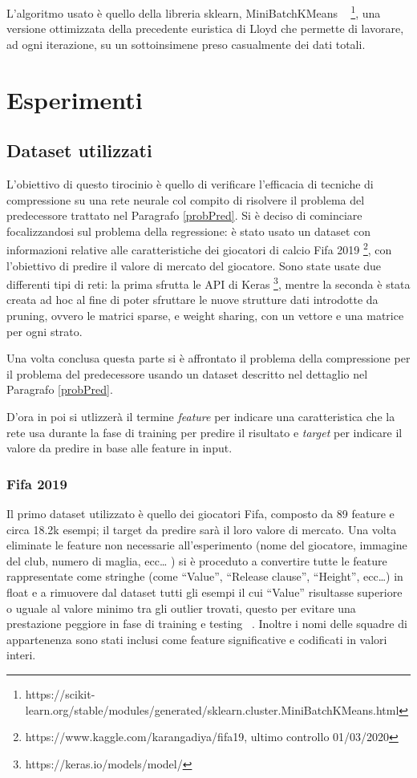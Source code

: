 \documentclass[12pt]{report}
\begin{document}
L’algoritmo usato è quello della libreria sklearn, MiniBatchKMeans ~\cite{KMeansMiniBatch} \footnote{https://scikit-learn.org/stable/modules/generated/sklearn.cluster.MiniBatchKMeans.html}, una versione ottimizzata della precedente euristica di Lloyd che permette di lavorare, ad ogni iterazione, su un sottoinsimene preso casualmente dei dati totali.


\chapter{Esperimenti}

\section{Dataset utilizzati}
L'obiettivo di questo tirocinio è quello di verificare l'efficacia di tecniche di compressione su una rete neurale col compito di risolvere il problema del predecessore trattato nel Paragrafo \ref{probPred}.
Si è deciso di cominciare focalizzandosi sul problema della regressione: è stato usato un dataset con informazioni relative alle caratteristiche dei giocatori di calcio Fifa 2019 \footnote{https://www.kaggle.com/karangadiya/fifa19, ultimo controllo 01/03/2020}, con l’obiettivo di predire il valore di mercato del giocatore. Sono state usate due differenti tipi di reti: la prima sfrutta le API di Keras \footnote{https://keras.io/models/model/}, mentre la seconda è stata creata ad hoc al fine di poter sfruttare le nuove strutture dati introdotte da pruning, ovvero le matrici sparse, e weight sharing, con un vettore e una matrice per ogni strato.

Una volta conclusa questa parte si è affrontato il problema della compressione per il problema del predecessore usando un dataset descritto nel dettaglio nel Paragrafo \ref{probPred}.

D'ora in poi si utlizzerà il termine \textit{feature} per indicare una caratteristica che la rete usa durante la fase di training per predire il risultato e \textit{target} per indicare il valore da predire in base alle feature in input.

\subsection{Fifa 2019}

Il primo dataset utilizzato è quello dei giocatori Fifa, composto da 89 feature e circa 18.2k esempi; il target da predire sarà il loro valore di mercato.
Una volta eliminate le feature non necessarie all’esperimento (nome del giocatore, immagine del club, numero di maglia, ecc… ) si è proceduto a convertire tutte le feature rappresentate come stringhe (come ``Value'', ``Release clause'', ``Height'', ecc…) in float e a rimuovere dal dataset tutti gli esempi il cui ``Value'' risultasse superiore o uguale al valore minimo tra gli outlier trovati, questo per evitare una prestazione peggiore in fase di training e testing ~\cite{Outlier}. Inoltre i nomi delle squadre di appartenenza sono stati inclusi come feature significative e codificati in valori interi.
\end{document}
